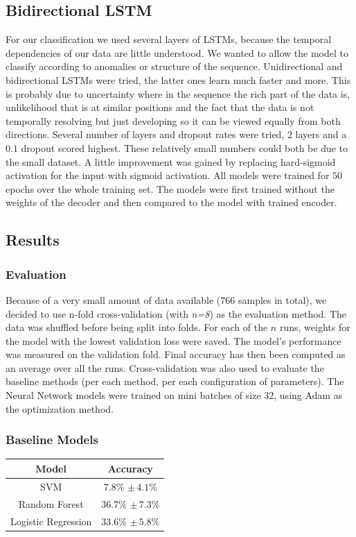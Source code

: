 \documentclass{article}
\begin{document}
\subsection{Bidirectional LSTM}
For our classification we used several layers of LSTMs, because the temporal dependencies of our data are little understood. We wanted to allow the model to classify according to anomalies or structure of the sequence. Unidirectional and bidirectional LSTMs were tried, the latter ones learn much faster and more. This is probably due to uncertainty where in the sequence the rich part of the data is, unlikelihood that is at similar positions and the fact that the data is not temporally resolving but just developing so it can be viewed equally from both directions. Several number of layers and dropout rates were tried, $2$ layers and a $0.1$ dropout scored highest. These relatively small numbers could both be due to the small dataset. A little improvement was gained by replacing hard-sigmoid activation for the input with sigmoid activation. All models were trained for $50$ epochs over the whole training set. The models were first trained without the weights of the decoder and then compared to the model with trained encoder.
\subsection{Results}
\subsubsection{Evaluation}
Because of a very small amount of data available (766 samples in total), we decided to use n-fold cross-validation (with \textit{n=8}) as the evaluation method. The data was shuffled before being split into folds. For each of the $n$ runs, weights for the model with the lowest validation loss were saved. The model's performance was measured on the validation fold. Final accuracy has then been computed as an average over all the runs.
Cross-validation was also used to evaluate the baseline methods (per each method, per each configuration of parameters).
\newline
The Neural Network models were trained on mini batches of size 32, using Adam \cite{Adam} as the optimization method.
\subsubsection{Baseline Models}
\begin{center}
\begin{tabular}{ c|c } 
 Model & Accuracy \\ 
 \hline
 SVM & 7.8\% $\pm \, 4.1\% $\\
 Random Forest & 36.7\% $\pm \, 7.3\%$ \\
 Logistic Regression & 33.6\% $\pm \, 5.8\%$ \\
\end{tabular}
\end{center}
\end{document}
